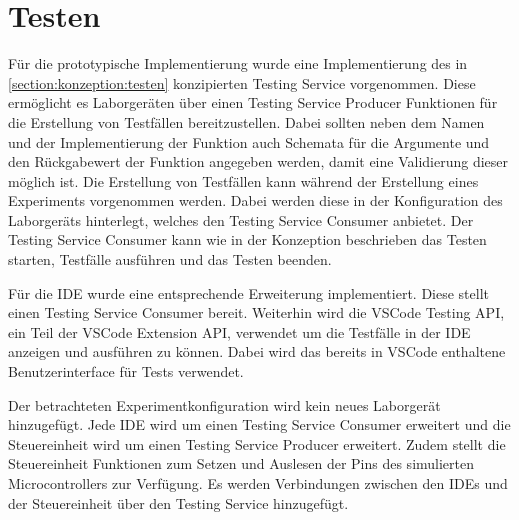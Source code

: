 \section{Testen}\label{section:prototypische-implementierung:testen}


Für die prototypische Implementierung wurde eine Implementierung des in \autoref{section:konzeption:testen} konzipierten Testing Service vorgenommen. Diese ermöglicht es Laborgeräten über einen Testing Service Producer Funktionen für die Erstellung von Testfällen bereitzustellen. Dabei sollten neben dem Namen und der Implementierung der Funktion auch Schemata für die Argumente und den Rückgabewert der Funktion angegeben werden, damit eine Validierung dieser möglich ist. Die Erstellung von Testfällen kann während der Erstellung eines Experiments vorgenommen werden. Dabei werden diese in der Konfiguration des Laborgeräts hinterlegt, welches den Testing Service Consumer anbietet. Der Testing Service Consumer kann wie in der Konzeption beschrieben das Testen starten, Testfälle ausführen und das Testen beenden.

Für die IDE wurde eine entsprechende Erweiterung implementiert. Diese stellt einen Testing Service Consumer bereit. Weiterhin wird die VSCode Testing API, ein Teil der VSCode Extension API, verwendet um die Testfälle in der IDE anzeigen und ausführen zu können. Dabei wird das bereits in VSCode enthaltene Benutzerinterface für Tests verwendet.

Der betrachteten Experimentkonfiguration wird kein neues Laborgerät hinzugefügt. Jede IDE wird um einen Testing Service Consumer erweitert und die Steuereinheit wird um einen Testing Service Producer erweitert. Zudem stellt die Steuereinheit Funktionen zum Setzen und Auslesen der Pins des simulierten Microcontrollers zur Verfügung. Es werden Verbindungen zwischen den IDEs und der Steuereinheit über den Testing Service hinzugefügt.